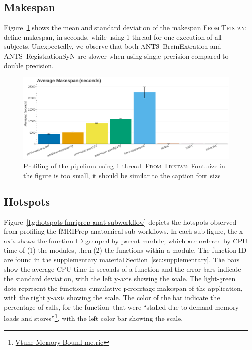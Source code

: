 \documentclass[conference]{IEEEtran}
\newcommand{\TG}[1]{\color{blue}\textsc{From Tristan: }#1\color{black}}
\begin{document}
\subsection{Makespan}
Figure~\ref{fig:makespan-1thread} shows the mean and standard deviation of the makespan \TG{define makespan}, in seconds, while using 1 thread for one execution of all subjects.
Unexpectedly, we observe that both ANTS~BrainExtration and ANTS~RegistrationSyN are slower when using single precision compared to double precision.
\begin{figure}[h]
	\centering
	\includegraphics[width=\linewidth]{figures/makespan-1thread.png}
	\caption{Profiling of the pipelines using 1 thread. \TG{Font size in the figure is too small, it should be similar to the caption font size}}
	\label{fig:makespan-1thread}
\end{figure}

\subsection{Hotspots}

Figure~\ref{fig:hotspots-fmriprep-anat-subworkflow} depicts the hotspots observed from profiling the fMRIPrep anatomical sub-workflows. In each sub-figure, the x-axis shows the function ID grouped by parent module, which are ordered by CPU time of (1) the modules, then (2) the functions within a module. The function ID are found in the supplementary material Section~\ref{sec:supplementary}. The bars show the average CPU time in seconds of a function and the error bars indicate the standard deviation, with the left y-axis showing the scale. The light-green dots represent the functions cumulative percentage makespan of the application, with the right y-axis showing the scale. The color of the bar indicate the percentage of calls, for the function, that were ``stalled due to demand memory loads and stores''\footnote{\href{https://www.intel.com/content/www/us/en/docs/vtune-profiler/user-guide/2023-0/cpu-metrics-reference.html\#MEMORY-BOUND}{Vtune Memory Bound metric}}, with the left color bar showing the scale.
\end{document}
